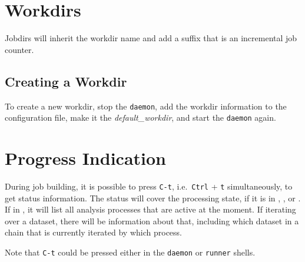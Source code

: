 \section{Workdirs}

Jobdirs will inherit the workdir name and add a suffix that is an
incremental job counter.

\subsection{Creating a Workdir}
To create a new workdir, stop the \texttt{daemon}, add the workdir
information to the configuration file, make it
the \textsl{default\_workdir}, and start the \texttt{daemon} again.


\section{Progress Indication}

During job building, it is possible to press \texttt{C-t},
i.e.\ \texttt{Ctrl} + \texttt{t} simultaneously, to get status
information.  The status will cover the processing state, if it is
in \prepare, \analysis, or \synthesis.  If in \analysis, it will list
all analysis processes that are active at the moment.  If iterating
over a dataset, there will be information about that, including which
dataset in a chain that is currently iterated by which \analysis
process.

Note that \texttt{C-t} could be pressed either in the \texttt{daemon}
or \texttt{runner} shells.
